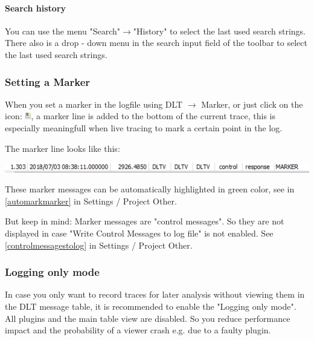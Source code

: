 \documentclass[a4paper,11pt]{article}
\newcommand{\caution}[1]{\begin{ibox} \textbf{CAUTION:} \emph{#1} \end{ibox}}
\begin{document}
\paragraph{Search history}
You can use the menu "Search"\ensuremath{\rightarrow}"History" to select the last used search strings.
There also is a drop - down menu in the search input field of the toolbar to select the last used search strings.


\subsubsection{Setting a Marker}

\label{settingmarker}
When you set a marker in the logfile using DLT \ensuremath{\rightarrow} Marker, or just click on the icon: \includegraphics[width=0.02\textwidth]{images/marker_icon.png},
a marker line is added to the bottom of the current trace, this is especially meaningfull when live tracing
to mark a certain point in the log.\linebreak

The marker line looks like this:\linebreak

\includegraphics[width=1.0\textwidth]{images/markermessage.png}

These marker messages can be automatically highlighted in green color, see in \autoref{automarkmarker} in Settings / Project Other.

But keep in mind: Marker messages are "control messages". So they are not displayed in case "Write Control Messages to log file" is not enabled.
See \autoref{controlmessagestolog} in Settings / Project Other.


\subsubsection{Logging only mode}
\label{Loggingonlymode}
In case you only want to record traces for later analysis without viewing them in the DLT message table,
it is recommended to enable the "Logging only mode". All plugins and the main table view are disabled.
So you reduce performance impact and the probability of a viewer crash e.g. due to a faulty plugin.
\end{document}
